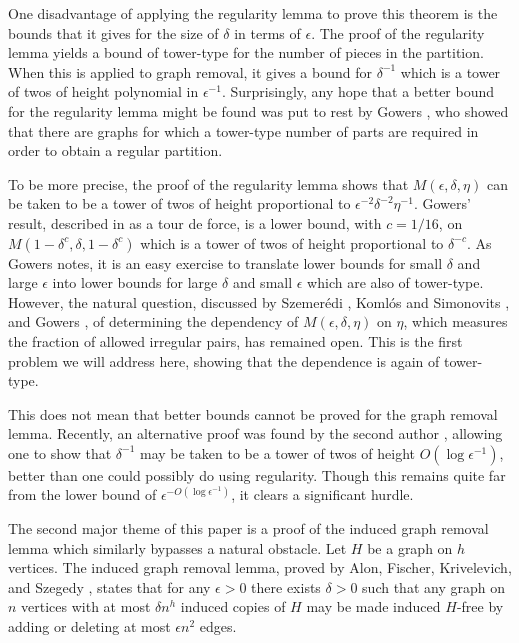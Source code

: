 \documentclass[11pt]{article}
\begin{document}
One disadvantage of applying the regularity lemma to prove this theorem is the bounds that it gives for the size of $\delta$ in terms of $\epsilon$. The proof of the regularity lemma yields a bound of tower-type for the number of pieces in the partition. When this is applied to graph removal, it gives a bound for $\delta^{-1}$ which is a tower
of twos of height polynomial in $\epsilon^{-1}$. Surprisingly, any hope that a
better bound for the regularity lemma might be found was put to rest by Gowers
\cite{Go}, who showed that there are graphs for which a tower-type number of
parts are required in order to obtain a regular partition.

To be more precise, the proof of the regularity lemma shows that
$M(\epsilon,\delta,\eta)$ can be taken to be a tower of twos of height
proportional to $\epsilon^{-2}\delta^{-2}\eta^{-1}$. Gowers' result, described
in \cite{Bo} as a tour de force, is a lower bound, with $c = 1/16$, on
$M(1-\delta^c,\delta,1-\delta^c)$ which is a tower of twos of height
proportional to $\delta^{-c}$. As Gowers notes, it is an easy exercise to
translate lower bounds for small $\delta$ and large $\epsilon$ into lower
bounds for large $\delta$ and small $\epsilon$ which are also of tower-type.
However, the natural question, discussed by Szemer\'edi \cite{Sz}, Koml\'os and Simonovits \cite{KoSi}, and Gowers \cite{Go}, of determining the dependency of $M(\epsilon,
\delta, \eta)$ on $\eta$, which measures the fraction of allowed irregular pairs, has remained open. This is the first problem we will address here, showing that the dependence is again of tower-type.

This does not mean that better bounds cannot be proved for the graph removal
lemma. Recently, an alternative proof was found by the second author \cite{Fo},
allowing one to show that $\delta^{-1}$ may be taken to be a tower of twos of
height $O(\log \epsilon^{-1})$, better than one could possibly do using
regularity. Though this remains quite far from the lower bound of $\epsilon^{-
O(\log \epsilon^{-1})}$, it clears a significant hurdle.

The second major theme of this paper is a proof of the induced graph removal
lemma which similarly bypasses a natural obstacle. Let $H$ be a graph on $h$
vertices. The induced graph removal lemma, proved by Alon, Fischer,
Krivelevich, and Szegedy \cite{AFKS}, states that for any $\epsilon > 0$ there
exists $\delta > 0$ such that any graph on $n$ vertices with at most $\delta
n^h$ induced copies of $H$ may be made induced $H$-free by adding or deleting
at most $\epsilon n^2$ edges.
\end{document}
